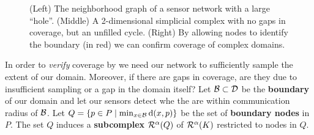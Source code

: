 \begin{figure}[htbp]
     \caption{(Left) The neighborhood graph of a sensor network with a large ``hole''.
            (Middle) A 2-dimensional simplicial complex with no gaps in coverage, but an unfilled cycle.
            (Right) By allowing nodes to identify the boundary (in red) we can confirm coverage of complex domains.}
     \label{fig:boundary1}
 \end{figure}

In order to \textit{verify} coverage by we need our network to sufficiently sample the extent of our domain.
Moreover, if there are gaps in coverage, are they due to insufficient sampling or a gap in the domain itself?
Let ${\mathcal{B}}\subset{\mathcal{D}}$ be the \textbf{boundary} of our domain and let our sensors detect whe the are within communication radius of ${\mathcal{B}}$.
Let $Q = \{p\in P\mid \min_{x\in{\mathcal{B}}}\mathrm{d}(x, p)\}$ be the set of \textbf{boundary nodes} in $P$.
The set $Q$ induces a \textbf{subcomplex} $\mathcal{R}^\alpha(Q)$ of $\mathcal{R}^\alpha(K)$ restricted to nodes in $Q$.



